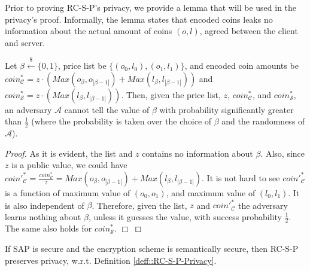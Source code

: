   
  Prior to proving  RC-S-P's privacy, we provide a lemma that will be used in the privacy's proof. Informally, the lemma states that encoded coins leaks no information about the actual amount of coins $(o,l)$, agreed between the client and server. 


\begin{lemma}\label{lemma::encoded-coins} Let $\beta\stackrel{\scriptscriptstyle\$}\leftarrow\{0,1\}$, price list be $\{(o_{\scriptscriptstyle 0},l_{\scriptscriptstyle 0}),(o_{\scriptscriptstyle 1},l_{\scriptscriptstyle 1})\}$, and encoded coin amounts be $coin^{\scriptscriptstyle *}_{\scriptscriptstyle\mathcal{C}}= z\cdot(Max(o_{\scriptscriptstyle\beta},o_{\scriptscriptstyle|\beta-1|})+Max(l_{\scriptscriptstyle\beta},l_{\scriptscriptstyle|\beta-1|}))$ and $coin^{\scriptscriptstyle *}_{\scriptscriptstyle\mathcal{S}}=z\cdot(Max(l_{\scriptscriptstyle\beta}, l_{\scriptscriptstyle |\beta-1|}))$. Then, given the price list, $z$, $coin^{\scriptscriptstyle *}_{\scriptscriptstyle\mathcal{C}}$, and $coin^{\scriptscriptstyle *}_{\scriptscriptstyle\mathcal{S}}$, an adversary $\mathcal{A}$ cannot tell the value of $\beta$ with probability significantly greater than $\frac{1}{2}$ (where the probability is taken over the choice of $\beta$ and the randomness of $\mathcal{A}$).
\end{lemma}



\begin{proof}
As it is evident, the list and $z$ contains no information about $\beta$. Also, since  $z$ is a public value, we could have   $coin'^{\scriptscriptstyle *}_{\scriptscriptstyle\mathcal C}=\frac{coin^{\scriptscriptstyle *}_{\scriptscriptstyle\mathcal C}}{z} = Max(o_{\scriptscriptstyle\beta},o_{\scriptscriptstyle|\beta-1|})+Max(l_{\scriptscriptstyle\beta}, l_{\scriptscriptstyle|\beta-1|})$. It is not hard to see $coin'^{\scriptscriptstyle *}_{\scriptscriptstyle\mathcal C}$ is a function of maximum value of $(o_{\scriptscriptstyle 0},o_{\scriptscriptstyle 1})$, and maximum value of $(l_{\scriptscriptstyle 0},l_{\scriptscriptstyle 1})$. It is also  independent of $\beta$. Therefore, given the list, $z$ and $coin'^{\scriptscriptstyle *}_{\scriptscriptstyle\mathcal C}$ the adversary learns nothing about $\beta$, unless it guesses the value,  with  success probability $\frac{1}{2}$. The same also holds for $coin^{\scriptscriptstyle *}_{\scriptscriptstyle\mathcal S}$. 
 \hfill\(\Box\)\end{proof}


\begin{lemma} If SAP is secure and the encryption scheme is semantically secure, then RC-S-P preserves privacy, w.r.t. Definition \ref{deff::RC-S-P-Privacy}. 
\end{lemma}

